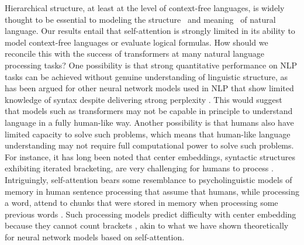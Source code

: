 \documentclass[11pt,a4paper]{article}
\begin{document}



Hierarchical structure, at least at the level of context-free languages, is widely thought to be essential to modeling the structure~\cite{everaert2015structures} and meaning~\cite{montague1973proper} of natural language.
Our results entail that self-attention is strongly limited in its ability to model context-free languages or evaluate logical formulas.
How should we reconcile this with the success of transformers at many natural language processing tasks?
One possibility is that strong quantitative performance on NLP tasks can be achieved without genuine understanding of linguistic structure, as has been argued for other neural network models used in NLP that show limited knowledge of syntax despite delivering strong perplexity  \cite{linzen2016assessing,marvin2018targeted}.
This would suggest that models such as transformers may not be capable in principle to understand language in a fully human-like way.
Another possibility is that humans also have limited capacity to solve such problems, which means that human-like language understanding may not require full computational power to solve such problems.
For instance, it has long been noted that center embeddings, syntactic structures exhibiting iterated bracketing, are very challenging for humans to process \cite{miller-finitary-1963,gibson1999memory}.
Intriguingly, self-attention bears some resemblance to psycholinguistic models of memory in human sentence processing that assume that humans, while processing a word, attend to chunks that were stored in memory when processing some previous words \cite{lewis2005activation,parker2017cue}.
Such processing models predict difficulty with center embedding because they cannot count brackets \cite{lewis2005activation}, akin to what we have shown theoretically for neural network models based on self-attention.
\end{document}
